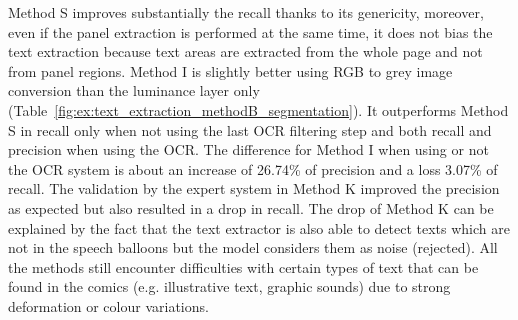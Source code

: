Method S improves substantially the recall thanks to its genericity, moreover, even if the panel extraction is performed at the same time, it does not bias the text extraction because text areas are extracted from the whole page and not from panel regions.
Method I is slightly better using RGB to grey image conversion than the luminance layer only (Table~\ref{fig:ex:text_extraction_methodB_segmentation}).
It outperforms Method S in recall only when not using the last OCR filtering step and both recall and precision when using the OCR.
The difference for Method I when using or not the OCR system is about an increase of 26.74\% of precision and a loss 3.07\% of recall.
The validation by the expert system in Method K improved the precision as expected but also resulted in a drop in recall.
The drop of Method K can be explained by the fact that the text extractor is also able to detect texts which are not in the speech balloons but the model considers them as noise (rejected).
All the methods still encounter difficulties with certain types of text that can be found in the comics (e.g. illustrative text, graphic sounds) due to strong deformation or colour variations.


